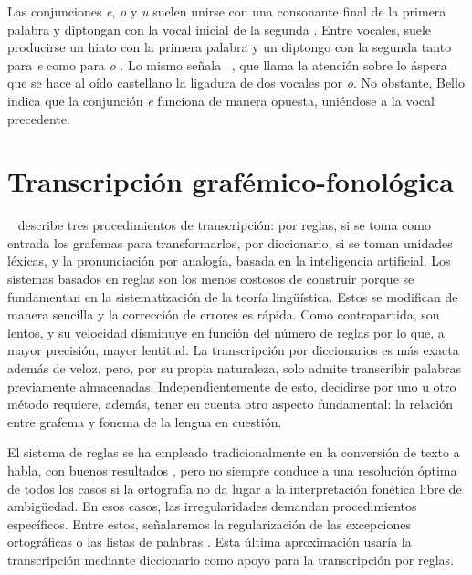 Las conjunciones \textit{e}, \textit{o} y \textit{u} suelen unirse con una consonante final de la primera palabra y diptongan con la vocal inicial de la segunda \parencite[60]{canellada1987}. Entre vocales, suele producirse un hiato con la primera palabra y un diptongo con la segunda tanto para \textit{e} como para \textit{o} \parencite[60]{canellada1987}. Lo mismo señala \citeauthor{bello1981}~\parencite*[109-111]{bello1981}, que llama la atención sobre lo áspera que se hace al oído castellano la ligadura de dos vocales por \textit{o}. No obstante, Bello indica que la conjunción \textit{e} funciona de manera opuesta, uniéndose a la vocal precedente. 
	
\section{Transcripción grafémico-fonológica}\label{transgraffon}
\citeauthor{riosmestre1999}~\parencite*[2.3]{riosmestre1999} describe tres procedimientos de transcripción: por reglas, si se toma como entrada los grafemas para transformarlos, por diccionario, si se toman unidades léxicas, y la pronunciación por analogía, basada en la inteligencia artificial. Los sistemas basados en reglas son los menos costosos de construir porque se fundamentan en la sistematización de la teoría lingüística. Estos se modifican de manera sencilla y la corrección de errores es rápida. Como contrapartida, son lentos, y su velocidad disminuye en función del número de reglas por lo que, a mayor precisión, mayor lentitud. La transcripción por diccionarios es más exacta además de veloz, pero, por su propia naturaleza, solo admite transcribir palabras previamente almacenadas. Independientemente de esto, decidirse por uno u otro método requiere, además, tener en cuenta otro aspecto fundamental: la relación entre grafema y fonema de la lengua en cuestión. 

El sistema de reglas se ha empleado tradicionalmente en la conversión de texto a habla, con buenos resultados \parencites{perez1991}{lopez1993}{rodriguez1998}, pero no siempre conduce a una resolución óptima de todos los casos si la ortografía no da lugar a la interpretación fonética libre de ambigüedad. En esos casos, las irregularidades demandan procedimientos específicos. Entre estos, señalaremos  la regularización de las excepciones ortográficas o las listas de palabras \parencite*[2.3]{riosmestre1999}. Esta última aproximación usaría la transcripción mediante diccionario como apoyo para la transcripción por reglas.

